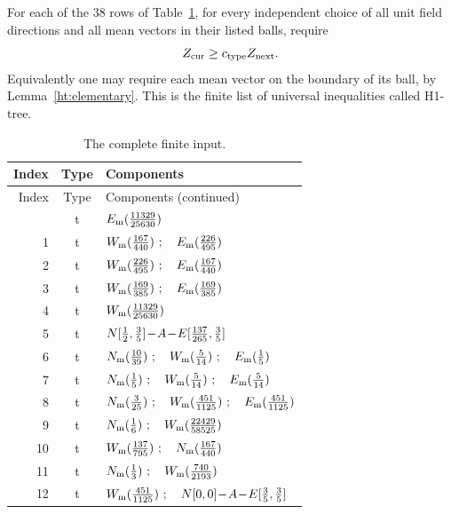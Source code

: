 \begin{htdef}[H1-tree]\label{ht:input}
For each of the 38 rows of Table~\ref{ht:modeltable}, for every independent
choice of all unit field directions and all mean vectors in their
listed balls, require
\begin{equation}\label{ht:h1tree}
 Z_{\rm cur}\ge c_{\rm type}Z_{\rm next}.
\end{equation}
Equivalently one may require each mean vector on the boundary of its
ball, by Lemma~\ref{ht:elementary}. This is the finite list of universal
inequalities called H1-tree.
\end{htdef}

\begingroup\small
\begin{longtable}{@{}rcp{}@{}}
\caption{The complete finite input.}\label{ht:modeltable}\\
\toprule Index & Type & Components\\\midrule\endfirsthead
\toprule Index & Type & Components (continued)\\\midrule\endhead
\bottomrule\endfoot
0 & t & \(E_{\rm m}(\frac{11329}{25630})\)\\[2pt]
1 & t & \(W_{\rm m}(\frac{167}{440})\ ;\quad E_{\rm m}(\frac{226}{495})\)\\[2pt]
2 & t & \(W_{\rm m}(\frac{226}{495})\ ;\quad E_{\rm m}(\frac{167}{440})\)\\[2pt]
3 & t & \(W_{\rm m}(\frac{169}{385})\ ;\quad E_{\rm m}(\frac{169}{385})\)\\[2pt]
4 & t & \(W_{\rm m}(\frac{11329}{25630})\)\\[2pt]
5 & t & \(N[\frac{1}{2},\frac{3}{5}]\! -\! A\! -\! E[\frac{137}{265},\frac{3}{5}]\)\\[2pt]
6 & t & \(N_{\rm m}(\frac{10}{39})\ ;\quad W_{\rm m}(\frac{5}{14})\ ;\quad E_{\rm m}(\frac{1}{5})\)\\[2pt]
7 & t & \(\htM{N}{\frac{1}{5}}\ ;\quad \htM{W}{\frac{5}{14}}\ ;\quad \htM{E}{\frac{5}{14}}\)\\[2pt]
8 & t & \(N_{\rm m}(\frac{3}{25})\ ;\quad W_{\rm m}(\frac{451}{1125})\ ;\quad E_{\rm m}(\frac{451}{1125})\)\\[2pt]
9 & t & \(N_{\rm m}(\frac{1}{6})\ ;\quad W_{\rm m}(\frac{22429}{58525})\)\\[2pt]
10 & t & \(W_{\rm m}(\frac{137}{795})\ ;\quad N_{\rm m}(\frac{167}{440})\)\\[2pt]
11 & t & \(N_{\rm m}(\frac{1}{3})\ ;\quad W_{\rm m}(\frac{740}{2193})\)\\[2pt]
12 & t & \(W_{\rm m}(\frac{451}{1125})\ ;\quad N[0,0]\! -\! A\! -\! E[\frac{3}{5},\frac{3}{5}]\)\\[2pt]

\end{longtable}
